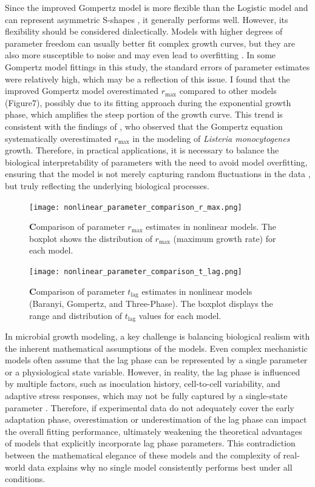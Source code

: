 \documentclass[12pt]{article}
\begin{document}
Since the improved Gompertz model is more flexible than the Logistic model and can represent asymmetric S-shapes \citep{Gibson1987}, it generally performs well. However, its flexibility should be considered dialectically. Models with higher degrees of parameter freedom can usually better fit complex growth curves, but they are also more susceptible to noise and may even lead to overfitting \citep{Merow2014}. In some Gompertz model fittings in this study, the standard errors of parameter estimates were relatively high, which may be a reflection of this issue. I found that the improved Gompertz model overestimated $r_{\text{max}}$ compared to other models (Figure7), possibly due to its fitting approach during the exponential growth phase, which amplifies the steep portion of the growth curve. This trend is consistent with the findings of \citet{Membre2002}, who observed that the Gompertz equation systematically overestimated $r_{\text{max}}$ in the modeling of \textit{Listeria monocytogenes} growth. Therefore, in practical applications, it is necessary to balance the biological interpretability of parameters with the need to avoid model overfitting, ensuring that the model is not merely capturing random fluctuations in the data \citep{CawleyTalbot2010}, but truly reflecting the underlying biological processes.

\begin{figure}[htbp]
    \centering
    \texttt{[image: nonlinear\_parameter\_comparison\_r\_max.png]}
    \caption{%
        \textbf Comparison of parameter \(r_{\max}\) estimates in nonlinear models.
        The boxplot shows the distribution of \(r_{\max}\) (maximum growth rate) for each model. 
    }
    \label{fig:r_max_estimates}
\end{figure}

\begin{figure}[htbp]
    \centering
    \texttt{[image: nonlinear\_parameter\_comparison\_t\_lag.png]}
    \caption{%
        \textbf Comparison of parameter \(t_{\mathrm{lag}}\) estimates in nonlinear models
        (Baranyi, Gompertz, and Three-Phase). The boxplot displays the range and distribution of
        \(t_{\mathrm{lag}}\) values for each model.
    }
    \label{fig:t_lag_estimates}
\end{figure}
In microbial growth modeling, a key challenge is balancing biological realism with the inherent mathematical assumptions of the models. Even complex mechanistic models often assume that the lag phase can be represented by a single parameter or a physiological state variable. However, in reality, the lag phase is influenced by multiple factors, such as inoculation history, cell-to-cell variability, and adaptive stress responses, which may not be fully captured by a single-state parameter \citep{BaranyiRoberts1994}. Therefore, if experimental data do not adequately cover the early adaptation phase, overestimation or underestimation of the lag phase can impact the overall fitting performance, ultimately weakening the theoretical advantages of models that explicitly incorporate lag phase parameters. This contradiction between the mathematical elegance of these models and the complexity of real-world data explains why no single model consistently performs best under all conditions.
\end{document}
